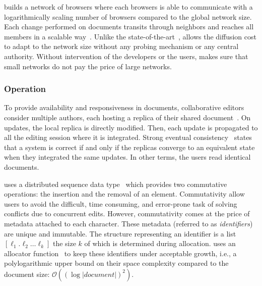 \CRATE builds a network of browsers where each browsers is able to communicate
with a logarithmically scaling number of browsers compared to the global network
size. Each change performed on documents transits through neighbors and reaches
all members in a scalable way~\cite{birman1999bimodal}. Unlike the
state-of-the-art~\cite{tolgyeski2009adaptive,voulgaris2005cyclon}, \SPRAY
allows the diffusion cost to adapt to the network size without any probing
mechanism or any central authority. Without intervention of the developers or
the users, \SPRAY makes sure that small networks do not pay the price of large
networks.

\subsubsection{Operation}

To provide availability and responsiveness in documents, collaborative
editors consider multiple authors, each hosting a replica of their
shared document~\cite{saito2005optimistic}.  On updates, the local
replica is directly modified. Then, each update is propagated to all
the editing session where it is integrated. Strong eventual
consistency~\cite{bailis2013eventual} states that a system is correct
if and only if the replicas converge to an equivalent state when they
integrated the same updates. In other terms, the users read identical
documents.

\CRATE uses a distributed sequence data type~\cite{shapiro2011conflict} which
provides two commutative operations: the insertion and the removal of an
element. Commutativity allow users to avoid the difficult, time consuming, and
error-prone task of solving conflicts due to concurrent edits. However,
commutativity comes at the price of metadata attached to each character. These
metadata (referred to as \emph{identifiers}) are unique and immutable. The
structure representing an identifier is a list $[\ell_1.\ell_2\ldots\ell_k]$ the
size $k$ of which is determined during allocation. \CRATE uses an allocator
function~\cite{nedelec2013lseq} to keep these identifiers under acceptable
growth, i.e., a polylogarithmic upper bound on their space complexity compared
to the document size: $\mathcal{O}((\log |document|)^2)$.


